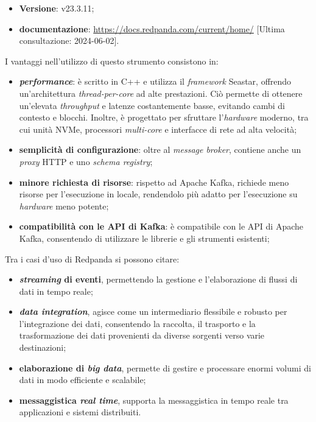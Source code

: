 \begin{itemize}
	\item \textbf{Versione}: v23.3.11;
	\item \textbf{documentazione}: \url{https://docs.redpanda.com/current/home/} [Ultima consultazione: 2024-06-02].
\end{itemize}

I vantaggi nell'utilizzo di questo strumento consistono in:
\begin{itemize}
	\item \textbf{\textit{performance}}: è scritto in C++ e utilizza il \textit{framework} Seastar, offrendo un'architettura \textit{thread-per-core} ad alte prestazioni.
	      Ciò permette di ottenere un'elevata \textit{throughput} e latenze costantemente basse, evitando cambi di contesto e blocchi.
	      Inoltre, è progettato per sfruttare l'\textit{hardware} moderno, tra cui unità NVMe, processori \textit{multi-core} e interfacce di rete ad alta velocità;
	\item \textbf{semplicità di configurazione}: oltre al \textit{message broker}, contiene anche un \textit{proxy} HTTP e uno \textit{schema registry};
	\item \textbf{minore richiesta di risorse}: rispetto ad Apache Kafka, richiede meno risorse per l'esecuzione in locale, rendendolo più adatto per l'esecuzione su \textit{hardware} meno potente;
	\item \textbf{compatibilità con le API di Kafka}: è compatibile con le API di Apache Kafka, consentendo di utilizzare le librerie e gli strumenti esistenti;
\end{itemize}
Tra i casi d'uso di Redpanda si possono citare:
\begin{itemize}
	\item \textbf{\textit{streaming} di eventi}, permettendo la gestione e l'elaborazione di flussi di dati in tempo reale;
	\item \textbf{\textit{data integration}}, agisce come un intermediario flessibile e robusto per l'integrazione dei dati, consentendo la raccolta, il trasporto e la trasformazione dei dati provenienti da diverse sorgenti verso varie destinazioni;
	\item \textbf{elaborazione di \textit{big data}}, permette di gestire e processare enormi volumi di dati in modo efficiente e scalabile;
	\item \textbf{messaggistica \textit{real time}}, supporta la messaggistica in tempo reale tra applicazioni e sistemi distribuiti.
\end{itemize}

